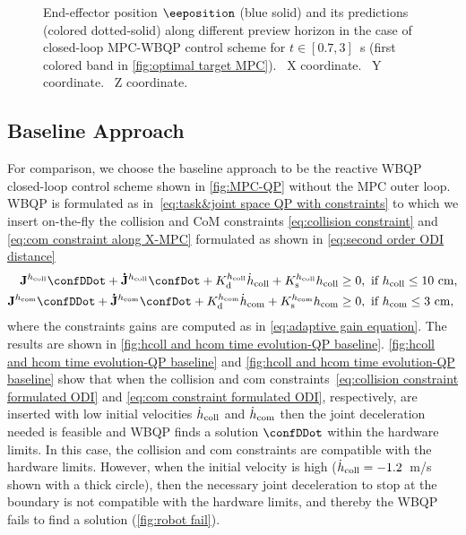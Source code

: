 \begin{figure}
	\centering
	\caption{End-effector position $\eeposition$ (blue solid) and its predictions (colored dotted-solid) along different preview horizon in the case of closed-loop MPC-WBQP control scheme for $t\in\left[0.7,3\right]$~s (first colored band in \cref{fig:optimal target MPC}).~ X coordinate.~ Y coordinate.~ Z coordinate.}
	\label{fig:endEff prediction MPC}	
\end{figure}
\subsection{Baseline Approach}
For comparison, we choose the baseline approach to be the reactive WBQP closed-loop control scheme shown in \cref{fig:MPC-QP} without the MPC outer  loop.  WBQP is formulated as in~\cref{eq:task&joint space QP with constraints} to which we insert on-the-fly the collision and CoM constraints \cref{eq:collision constraint} and \cref{eq:com constraint along X-MPC} formulated as shown in \cref{eq:second order ODI distance}
\begin{align}
\label{eq:collision constraint formulated ODI}	\mathbf{J}^{h_{\rm coll}}\confDDot + \mathbf{\dot{J}}^{h_{\rm coll}}\confDot  +K_{\rm d}^{h_{\rm coll}}\dot{h}_{\rm coll} +K_{\rm s}^{h_{\rm coll}}h_{\rm coll} &\geq0, \ \text{if~} h_{\rm coll}\leq10~\text{cm},\\
\label{eq:com constraint formulated ODI}	\mathbf{J}^{h_{\rm com}}\confDDot + \mathbf{\dot{J}}^{h_{\rm com}}\confDot  +K_{\rm d}^{h_{\rm com}}\dot{h}_{\rm com} +K_{\rm s}^{h_{\rm com}}h_{\rm com} &\geq0, \ \text{if~} h_{\rm com}\leq3~\text{cm},
\end{align}
 where the constraints gains are computed as in \cref{eq:adaptive gain equation}. The results are shown in \cref{fig:hcoll and hcom time evolution-QP baseline}. \cref{fig:hcoll and hcom time evolution-QP baseline} and \cref{fig:hcoll and hcom time evolution-QP baseline} show that when the collision and com constraints~\cref{eq:collision constraint formulated ODI} and \cref{eq:com constraint formulated ODI}, respectively, are inserted  with low initial velocities $\dot{h}_{\rm coll}$ and $\dot{h}_{\rm com}$ then the joint deceleration needed is feasible and WBQP finds a solution $\confDDot$ within the hardware limits. In this case, the collision and com constraints are compatible with the hardware limits. However, when the initial velocity is high ($\dot{h}_{\rm coll}=-1.2$~m/s shown with a thick circle), then the necessary joint deceleration to stop at the boundary is not compatible with the hardware limits, and thereby the WBQP fails to find a solution (\cref{fig:robot fail}).  


